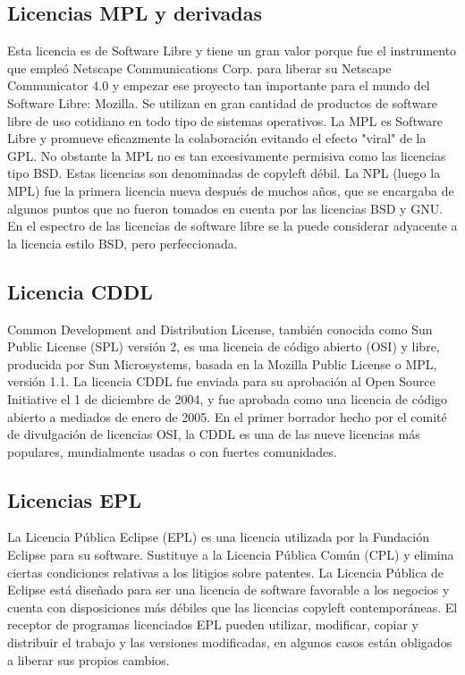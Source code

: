 			\subsection{Licencias MPL y derivadas}\label{mpl}
			
					Esta licencia es de Software Libre y tiene un gran valor porque fue el instrumento que empleó Netscape Communications Corp. para liberar su Netscape Communicator 4.0 y empezar ese proyecto tan importante para el mundo del Software Libre: Mozilla. Se utilizan en gran cantidad de productos de software libre de uso cotidiano en todo tipo de sistemas operativos. La MPL es Software Libre y promueve eficazmente la colaboración evitando el efecto "viral" de la GPL. No obstante la MPL no es tan excesivamente permisiva como las licencias tipo BSD. Estas licencias son denominadas de copyleft débil. La NPL (luego la MPL) fue la primera licencia nueva después de muchos años, que se encargaba de algunos puntos que no fueron tomados en cuenta por las licencias BSD y GNU. En el espectro de las licencias de software libre se la puede considerar adyacente a la licencia estilo BSD, pero perfeccionada.\par
			
			\subsection{Licencia CDDL}\label{cddl}
			
				Common Development and Distribution License, también conocida como Sun Public License (SPL) versión 2, es una licencia de código abierto (OSI) y libre, producida por Sun Microsystems, basada en la Mozilla Public License o MPL, versión 1.1. La licencia CDDL fue enviada para su aprobación al Open Source Initiative el 1 de diciembre de 2004, y fue aprobada como una licencia de código abierto a mediados de enero de 2005. En el primer borrador hecho por el comité de divulgación de licencias OSI, la CDDL es una de las nueve licencias más populares, mundialmente usadas o con fuertes comunidades.\par
				
			\subsection{Licencias EPL}\label{epl}
			
				La Licencia Pública Eclipse (EPL) es una licencia utilizada por la Fundación Eclipse para su software. Sustituye a la Licencia Pública Común (CPL) y elimina ciertas condiciones relativas a los litigios sobre patentes. La Licencia Pública de Eclipse está diseñado para ser una licencia de software favorable a los negocios y cuenta con disposiciones más débiles que las licencias copyleft contemporáneas. El receptor de programas licenciados EPL pueden utilizar, modificar, copiar y distribuir el trabajo y las versiones modificadas, en algunos casos están obligados a liberar sus propios cambios.\par
			
